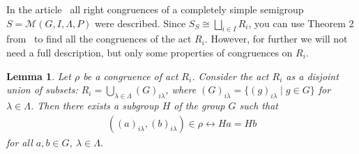 \documentclass{birkau}
\numberwithin{equation}{section}
\theoremstyle{plain}
\newtheorem{lemma}[theorem]{Lemma}
\theoremstyle{definition}
\begin{document}
	\par In the article~\cite{oehmke} all right congruences of a completely simple semigroup $S = \mathcal{M}(G,I,\Lambda,P)$ were described. Since $S_S \cong \bigsqcup_{i \in I} R_i$, you can use Theorem 2 from~\cite{oehmke} to find all the congruences of the act $R_i$. However, for further we will not need a full description, but only some properties of congruences on $R_i$.
	
	\begin{lemma} \label{l2.3}
	    Let $\rho$ be a congruence of act $ R_i$. Consider the act $R_i$ as a disjoint union of subsets: $R_i = \bigcup_{\lambda \in \Lambda}(G)_{i \lambda}$, where $(G)_{i \lambda} = \{ (g)_{i \lambda} \mid g \in G \}$ for $\lambda \in \Lambda$. Then there exists a subgroup $H$ of the group $G$ such that
		\begin{gather}
			((a)_{i \lambda},(b)_{i \lambda}) \in \rho \leftrightarrow Ha = Hb \label{f2.1}
		\end{gather}
		for all $a,b \in G$, $\lambda \in \Lambda$.
	\end{lemma}
\end{document}
